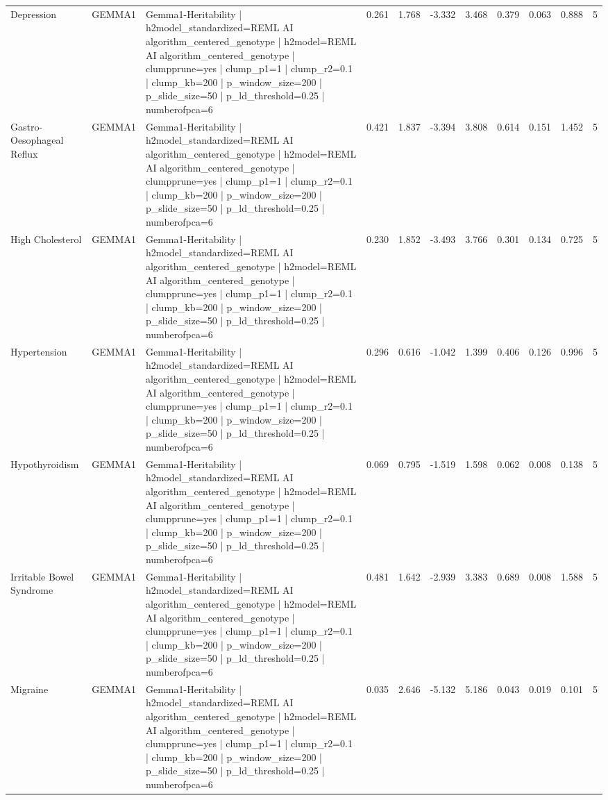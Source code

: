\begin{landscape}
\begin{longtable}{p{2.4cm}p{1.8cm}p{6.0cm}rrrrrrrr}
Depression & GEMMA1 & Gemma1-Heritability | h2model\_standardized=REML AI algorithm\_centered\_genotype | h2model=REML AI algorithm\_centered\_genotype | clumpprune=yes | clump\_p1=1 | clump\_r2=0.1 | clump\_kb=200 | p\_window\_size=200 | p\_slide\_size=50 | p\_ld\_threshold=0.25 | numberofpca=6 & 0.261 & 1.768 & -3.332 & 3.468 & 0.379 & 0.063 & 0.888 & 5 \\
Gastro-Oesophageal Reflux & GEMMA1 & Gemma1-Heritability | h2model\_standardized=REML AI algorithm\_centered\_genotype | h2model=REML AI algorithm\_centered\_genotype | clumpprune=yes | clump\_p1=1 | clump\_r2=0.1 | clump\_kb=200 | p\_window\_size=200 | p\_slide\_size=50 | p\_ld\_threshold=0.25 | numberofpca=6 & 0.421 & 1.837 & -3.394 & 3.808 & 0.614 & 0.151 & 1.452 & 5 \\
High Cholesterol & GEMMA1 & Gemma1-Heritability | h2model\_standardized=REML AI algorithm\_centered\_genotype | h2model=REML AI algorithm\_centered\_genotype | clumpprune=yes | clump\_p1=1 | clump\_r2=0.1 | clump\_kb=200 | p\_window\_size=200 | p\_slide\_size=50 | p\_ld\_threshold=0.25 | numberofpca=6 & 0.230 & 1.852 & -3.493 & 3.766 & 0.301 & 0.134 & 0.725 & 5 \\
Hypertension & GEMMA1 & Gemma1-Heritability | h2model\_standardized=REML AI algorithm\_centered\_genotype | h2model=REML AI algorithm\_centered\_genotype | clumpprune=yes | clump\_p1=1 | clump\_r2=0.1 | clump\_kb=200 | p\_window\_size=200 | p\_slide\_size=50 | p\_ld\_threshold=0.25 | numberofpca=6 & 0.296 & 0.616 & -1.042 & 1.399 & 0.406 & 0.126 & 0.996 & 5 \\
Hypothyroidism & GEMMA1 & Gemma1-Heritability | h2model\_standardized=REML AI algorithm\_centered\_genotype | h2model=REML AI algorithm\_centered\_genotype | clumpprune=yes | clump\_p1=1 | clump\_r2=0.1 | clump\_kb=200 | p\_window\_size=200 | p\_slide\_size=50 | p\_ld\_threshold=0.25 | numberofpca=6 & 0.069 & 0.795 & -1.519 & 1.598 & 0.062 & 0.008 & 0.138 & 5 \\
Irritable Bowel Syndrome & GEMMA1 & Gemma1-Heritability | h2model\_standardized=REML AI algorithm\_centered\_genotype | h2model=REML AI algorithm\_centered\_genotype | clumpprune=yes | clump\_p1=1 | clump\_r2=0.1 | clump\_kb=200 | p\_window\_size=200 | p\_slide\_size=50 | p\_ld\_threshold=0.25 | numberofpca=6 & 0.481 & 1.642 & -2.939 & 3.383 & 0.689 & 0.008 & 1.588 & 5 \\
Migraine & GEMMA1 & Gemma1-Heritability | h2model\_standardized=REML AI algorithm\_centered\_genotype | h2model=REML AI algorithm\_centered\_genotype | clumpprune=yes | clump\_p1=1 | clump\_r2=0.1 | clump\_kb=200 | p\_window\_size=200 | p\_slide\_size=50 | p\_ld\_threshold=0.25 | numberofpca=6 & 0.035 & 2.646 & -5.132 & 5.186 & 0.043 & 0.019 & 0.101 & 5 \\

\end{longtable}
\end{landscape}

